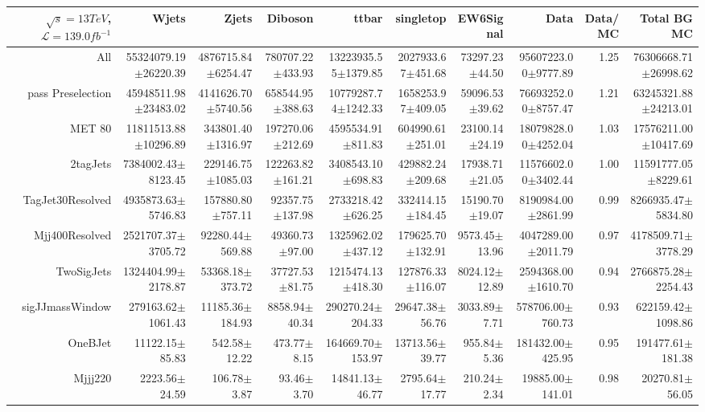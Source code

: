  \begin{tabular}{ r ||  r  r  r  r  r  r || r r r |} 
 \ensuremath{\sqrt{s}=13 TeV}, \ensuremath{\mathcal{L}=139.0 fb^{-1}}  & Wjets & Zjets & Diboson & ttbar & singletop & EW6Signal& Data & Data/MC & Total BG MC \tabularnewline 
 \hline 
All & 55324079.19$\pm$26220.39 & 4876715.84$\pm$6254.47 & 780707.22$\pm$433.93 & 13223935.55$\pm$1379.85 & 2027933.67$\pm$451.68 & 73297.23$\pm$44.50 & 95607223.00$\pm$9777.89 & 1.25 & 76306668.71$\pm$26998.62\tabularnewline \hline 
pass Preselection & 45948511.98$\pm$23483.02 & 4141626.70$\pm$5740.56 & 658544.95$\pm$388.63 & 10779287.74$\pm$1242.33 & 1658253.97$\pm$409.05 & 59096.53$\pm$39.62 & 76693252.00$\pm$8757.47 & 1.21 & 63245321.88$\pm$24213.01\tabularnewline \hline 
MET 80 & 11811513.88$\pm$10296.89 & 343801.40$\pm$1316.97 & 197270.06$\pm$212.69 & 4595534.91$\pm$811.83 & 604990.61$\pm$251.01 & 23100.14$\pm$24.19 & 18079828.00$\pm$4252.04 & 1.03 & 17576211.00$\pm$10417.69\tabularnewline \hline 
2tagJets & 7384002.43$\pm$8123.45 & 229146.75$\pm$1085.03 & 122263.82$\pm$161.21 & 3408543.10$\pm$698.83 & 429882.24$\pm$209.68 & 17938.71$\pm$21.05 & 11576602.00$\pm$3402.44 & 1.00 & 11591777.05$\pm$8229.61\tabularnewline \hline 
TagJet30Resolved & 4935873.63$\pm$5746.83 & 157880.80$\pm$757.11 & 92357.75$\pm$137.98 & 2733218.42$\pm$626.25 & 332414.15$\pm$184.45 & 15190.70$\pm$19.07 & 8190984.00$\pm$2861.99 & 0.99 & 8266935.47$\pm$5834.80\tabularnewline \hline 
Mjj400Resolved & 2521707.37$\pm$3705.72 & 92280.44$\pm$569.88 & 49360.73$\pm$97.00 & 1325962.02$\pm$437.12 & 179625.70$\pm$132.91 & 9573.45$\pm$13.96 & 4047289.00$\pm$2011.79 & 0.97 & 4178509.71$\pm$3778.29\tabularnewline \hline 
TwoSigJets & 1324404.99$\pm$2178.87 & 53368.18$\pm$373.72 & 37727.53$\pm$81.75 & 1215474.13$\pm$418.30 & 127876.33$\pm$116.07 & 8024.12$\pm$12.89 & 2594368.00$\pm$1610.70 & 0.94 & 2766875.28$\pm$2254.43\tabularnewline \hline 
sigJJmassWindow & 279163.62$\pm$1061.43 & 11185.36$\pm$184.93 & 8858.94$\pm$40.34 & 290270.24$\pm$204.33 & 29647.38$\pm$56.76 & 3033.89$\pm$7.71 & 578706.00$\pm$760.73 & 0.93 & 622159.42$\pm$1098.86\tabularnewline \hline 
OneBJet & 11122.15$\pm$85.83 & 542.58$\pm$12.22 & 473.77$\pm$8.15 & 164669.70$\pm$153.97 & 13713.56$\pm$39.77 & 955.84$\pm$5.36 & 181432.00$\pm$425.95 & 0.95 & 191477.61$\pm$181.38\tabularnewline \hline 
Mjjj220 & 2223.56$\pm$24.59 & 106.78$\pm$3.87 & 93.46$\pm$3.70 & 14841.13$\pm$46.77 & 2795.64$\pm$17.77 & 210.24$\pm$2.34 & 19885.00$\pm$141.01 & 0.98 & 20270.81$\pm$56.05\tabularnewline \hline 
\end{tabular}
